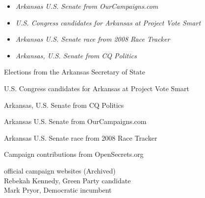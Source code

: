 \begin{itemize}
\item
  \emph{Arkansas U.S. Senate from OurCampaigns.com}
\item
  \emph{U.S. Congress candidates for Arkansas at Project Vote Smart}
\item
  \emph{Arkansas U.S. Senate race from 2008 Race Tracker}
\item
  \emph{Arkansas, U.S. Senate from CQ Politics}
\end{itemize}

Elections from the Arkansas Secretary of State

U.S. Congress candidates for Arkansas at Project Vote Smart

Arkansas, U.S. Senate from CQ Politics

Arkansas U.S. Senate from OurCampaigns.com

Arkansas U.S. Senate race from 2008 Race Tracker

Campaign contributions from OpenSecrets.org

official campaign websites (Archived)\\
Rebekah Kennedy, Green Party candidate\\
Mark Pryor, Democratic incumbent
